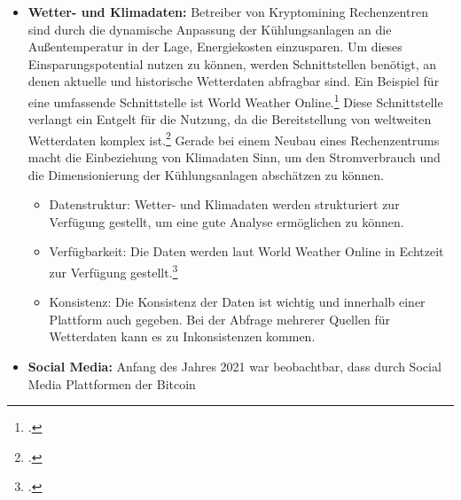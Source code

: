 \begin{itemize}
    zwischen \ac{BTC} und \ac{USD}. Zum anderen müssen die Handelsgebühren einer Tauschbörse noch zusätzlich in Betracht
    gezogen werden. Alle diese Werte unterscheiden sich von Börse zu Börse. Tauschbörsen haben umfangreiche und
    performante \acp{API}, um mit diesen sehr schnell handeln zu können.
    \begin{itemize}
        \item Datenstruktur: Tauschbörsen bieten strukturierte Daten an. Nur diese Form der Daten lässt eine sehr schnelle
        Bearbeitung und Analyse zu.\footcite[Vgl.][S. 27]{kimble2015big}
        \item Verfügbarkeit: Die Schnittstellen der Börse stellen Daten in Echtzeit bereit.
        \item Konsistenz: Die Daten der Tauschbörsen müssen konsistent sein, da sonst Probleme im Handel auftreten können.
    \end{itemize}
    \item \textbf{Wetter- und Klimadaten: }Betreiber von Kryptomining Rechenzentren sind durch die dynamische Anpassung der
    Kühlungsanlagen an die Außentemperatur in der Lage, Energiekosten einzusparen. Um dieses Einsparungspotential nutzen zu
    können, werden Schnittstellen benötigt, an denen aktuelle und historische Wetterdaten abfragbar sind. Ein Beispiel für
    eine umfassende Schnittstelle ist World Weather Online.\footcite[Vgl.][]{wwo2021api} Diese Schnittstelle verlangt ein Entgelt
    für die Nutzung, da die Bereitstellung von weltweiten Wetterdaten komplex ist.\footcite[Vgl.][]{wwo2021pricing} Gerade bei
    einem Neubau eines Rechenzentrums macht die Einbeziehung von Klimadaten Sinn, um den Stromverbrauch und die Dimensionierung
    der Kühlungsanlagen abschätzen zu können.
    \begin{itemize}
        \item Datenstruktur: Wetter- und Klimadaten werden strukturiert zur Verfügung gestellt, um eine gute Analyse ermöglichen
        zu können.
        \item Verfügbarkeit: Die Daten werden laut World Weather Online in Echtzeit zur Verfügung
        gestellt.\footcite[Vgl.][]{wwo2021api}
        \item Konsistenz: Die Konsistenz der Daten ist wichtig und innerhalb einer Plattform auch gegeben. Bei der Abfrage
        mehrerer Quellen für Wetterdaten kann es zu Inkonsistenzen kommen.
    \end{itemize}
    \item \textbf{Social Media: }Anfang des Jahres 2021 war beobachtbar, dass durch Social Media Plattformen der Bitcoin

\end{itemize}
